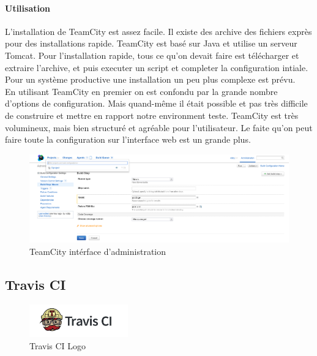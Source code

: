 \paragraph{Utilisation}
L'installation de TeamCity est assez facile. Il existe des archive des fichiers exprès pour des installations rapide. TeamCity est basé sur Java et utilise un serveur Tomcat. Pour l'installation rapide, tous ce qu'on devait faire est télécharger et extraire l'archive, et puis executer un script et completer la configuration intiale. Pour un système productive une installation un peu plus complexe est prévu.\\
En utilisant TeamCity en premier on est confondu par la grande nombre d'options de configuration. Mais quand-même il était possible et pas très difficile de construire et mettre en rapport notre environment teste. TeamCity est très volumineux, mais bien structuré et agréable pour l'utilisateur. Le faite qu'on peut faire toute la configuration sur l'interface web est un grande plus.
\begin{figure}[H]
	\centering
		\includegraphics[scale=0.35]{bilder/teamcityadmin}
	\caption{TeamCity intérface d'administration}
	\label{fig:travisgui}
\end{figure}





\clearpage
\subsection{Travis CI}
\begin{figure}
  \begin{center}
    \includegraphics[width=0.38\textwidth]{bilder/Travis-CI-logo}
  \end{center}
  \caption{Travis CI Logo}
\end{figure}
